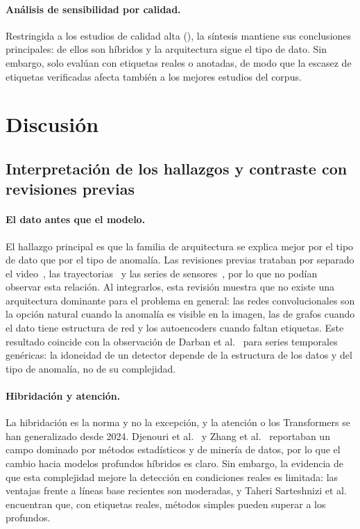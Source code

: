 \documentclass[12pt, a4paper]{article}
\begin{document}
\paragraph{An\'{a}lisis de sensibilidad por calidad.} Restringida a los \NaltaCalidad{} estudios de calidad alta (\IDaltaCalidad), la s\'{i}ntesis mantiene sus conclusiones principales: \NaltaHibrido{} de ellos son h\'{i}bridos y la arquitectura sigue el tipo de dato. Sin embargo, solo \NaltaEtiqReal{} eval\'{u}an con etiquetas reales o anotadas, de modo que la escasez de etiquetas verificadas afecta tambi\'{e}n a los mejores estudios del corpus.

\section{Discusi\'{o}n}
\label{sec:discusion}

\subsection{Interpretaci\'{o}n de los hallazgos y contraste con revisiones previas}

\paragraph{El dato antes que el modelo.} El hallazgo principal es que la familia de arquitectura se explica mejor por el tipo de dato que por el tipo de anomal\'{i}a. Las revisiones previas trataban por separado el video~\cite{santhosh2020anomaly,fang2024vision}, las trayectorias~\cite{belhadi2020trajectory} y las series de sensores~\cite{djenouri2019survey}, por lo que no pod\'{i}an observar esta relaci\'{o}n. Al integrarlos, esta revisi\'{o}n muestra que no existe una arquitectura dominante para el problema en general: las redes convolucionales son la opci\'{o}n natural cuando la anomal\'{i}a es visible en la imagen, las de grafos cuando el dato tiene estructura de red y los autoencoders cuando faltan etiquetas. Este resultado coincide con la observaci\'{o}n de Darban et al.~\cite{darban2024deep} para series temporales gen\'{e}ricas: la idoneidad de un detector depende de la estructura de los datos y del tipo de anomal\'{i}a, no de su complejidad.

\paragraph{Hibridaci\'{o}n y atenci\'{o}n.} La hibridaci\'{o}n es la norma y no la excepci\'{o}n, y la atenci\'{o}n o los Transformers se han generalizado desde 2024. Djenouri et al.~\cite{djenouri2019survey} y Zhang et al.~\cite{zhang2020urban} reportaban un campo dominado por m\'{e}todos estad\'{i}sticos y de miner\'{i}a de datos, por lo que el cambio hacia modelos profundos h\'{i}bridos es claro. Sin embargo, la evidencia de que esta complejidad mejore la detecci\'{o}n en condiciones reales es limitada: las ventajas frente a l\'{i}neas base recientes son moderadas, y Taheri Sarteshnizi et al.~\cite{taheri2026applicability} encuentran que, con etiquetas reales, m\'{e}todos simples pueden superar a los profundos.
\end{document}
